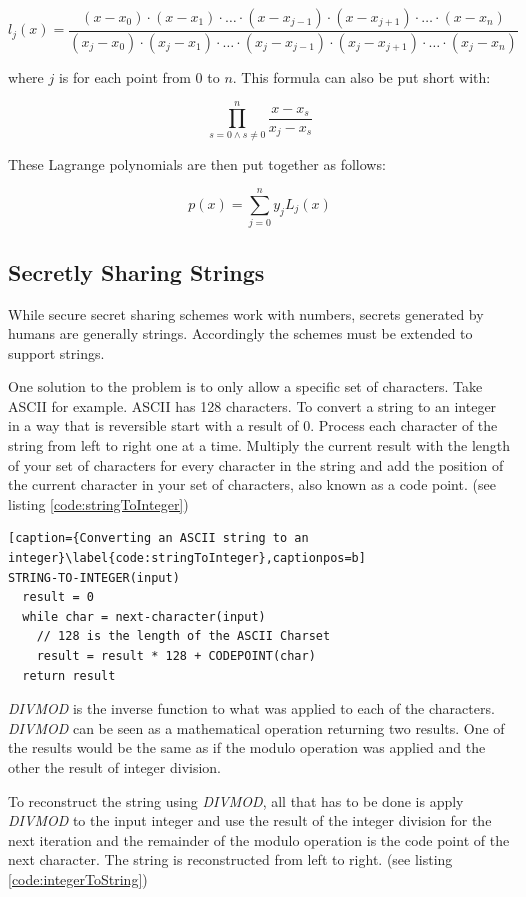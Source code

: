$$l_j(x) = \frac{(x - x_0) \cdot (x - x_1) \cdot \ldots \cdot (x - x_{j - 1}) \cdot (x - x_{j + 1}) \cdot \ldots \cdot (x - x_n)}
{(x_j - x_0) \cdot (x_j - x_1) \cdot \ldots \cdot (x_j - x_{j - 1}) \cdot (x_j - x_{j + 1}) \cdot \ldots \cdot (x_j - x_n)}$$

where $j$ is for each point from $0$ to $n$. This formula can also be put short with:

$$\prod_{s = 0 \wedge s \neq 0}^{n} \frac{x - x_s}{x_j - x_s}$$

These Lagrange polynomials are then put together as follows:

$$p(x) = \sum_{j = 0}^{n} y_jL_j(x)$$

\subsection{Secretly Sharing Strings}

While secure secret sharing schemes work with numbers, secrets generated by
humans are generally strings. Accordingly the schemes must be extended to
support strings.

One solution to the problem is to only allow a specific set of characters. Take
ASCII for example. ASCII has 128 characters. To convert a string to an integer
in a way that is reversible start with a result of 0. Process each character of
the string from left to right one at a time. Multiply the current result with
the length of your set of characters for every character in the string and add
the position of the current character in your set of characters, also known as
a code point. (see listing \ref{code:stringToInteger})

\begin{lstlisting}[caption={Converting an ASCII string to an integer}\label{code:stringToInteger},captionpos=b]
STRING-TO-INTEGER(input)
  result = 0
  while char = next-character(input)
    // 128 is the length of the ASCII Charset
    result = result * 128 + CODEPOINT(char)
  return result
\end{lstlisting}

\textit{DIVMOD} is the inverse function to what was applied to each of the
characters. \textit{DIVMOD} can be seen as a mathematical operation returning
two results. One of the results would be the same as if the modulo operation
was applied and the other the result of integer division.

To reconstruct the string using \textit{DIVMOD}, all that has to be done is
apply \textit{DIVMOD} to the input integer and use the result of the integer
division for the next iteration and the remainder of the modulo operation is
the code point of the next character. The string is reconstructed from left to
right. (see listing \ref{code:integerToString})


